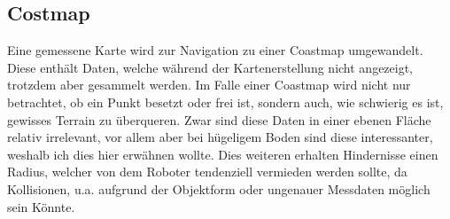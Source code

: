{{		\subsection{Costmap}
		{
			Eine gemessene Karte wird zur Navigation zu einer Coastmap umgewandelt. Diese enthält Daten, welche während  der Kartenerstellung nicht angezeigt, trotzdem aber gesammelt werden. Im Falle einer Coastmap wird nicht nur betrachtet, ob ein Punkt besetzt oder frei ist, sondern auch, wie schwierig es ist, gewisses Terrain zu überqueren. Zwar sind diese Daten in einer ebenen Fläche relativ irrelevant, vor allem aber bei hügeligem Boden sind diese interessanter, weshalb ich dies hier erwähnen wollte. Dies weiteren erhalten Hindernisse einen Radius, welcher von dem Roboter tendenziell vermieden werden sollte, da Kollisionen, u.a. aufgrund der Objektform oder ungenauer Messdaten möglich sein Könnte.
		}
		
}}
